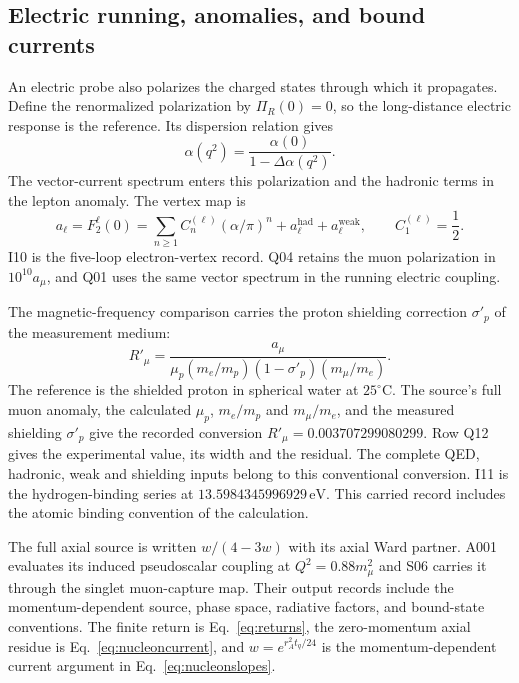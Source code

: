 \documentclass[aps,prx,onecolumn,10pt,notitlepage,nofootinbib,longbibliography]{revtex4-2}
\numberwithin{equation}{section}
\numberwithin{table}{section}
\newcommand{\eV}{\,\mathrm{eV}}
\begin{document}
\subsection{Electric running, anomalies, and bound currents}
An electric probe also polarizes the charged states through which it propagates. Define the renormalized polarization by $\Pi_R(0)=0$, so the long-distance electric response is the reference. Its dispersion relation gives
\begin{equation}
 \alpha(q^2)=\frac{\alpha(0)}{1-\Delta\alpha(q^2)}.
\end{equation}
The vector-current spectrum enters this polarization and the hadronic terms in the lepton anomaly. The vertex map is
\begin{equation}
 a_\ell=F_2^\ell(0)=\sum_{n\geq1}C_n^{(\ell)}(\alpha/\pi)^n
 +a_\ell^{\mathrm{had}}+a_\ell^{\mathrm{weak}},
 \qquad C_1^{(\ell)}=\frac12.
\end{equation}
I10 is the five-loop electron-vertex record. Q04 retains the muon polarization in $10^{10}a_\mu$, and Q01 uses the same vector spectrum in the running electric coupling.

The magnetic-frequency comparison carries the proton shielding correction $\sigma'_p$ of the measurement medium:
\begin{equation}
 R'_\mu=\frac{a_\mu}
 {\mu_p(m_e/m_p)(1-\sigma'_p)(m_\mu/m_e)}.
\end{equation}
The reference is the shielded proton in spherical water at $25^\circ\mathrm C$.
The source's full muon anomaly, the calculated $\mu_p$, $m_e/m_p$ and $m_\mu/m_e$,
and the measured shielding $\sigma'_p$ give the recorded conversion
$R'_\mu=0.003707299080299$. Row Q12 gives the experimental value,
its width and the residual.
The complete QED, hadronic, weak and shielding inputs belong to this conventional
conversion.\cite{MuonG2Final}
 I11 is the hydrogen-binding series at $13.5984345996929\eV$. This carried record includes the atomic binding convention of the calculation.

The full axial source is written $w/(4-3w)$ with its axial Ward partner. A001 evaluates its induced pseudoscalar coupling at $Q^2=0.88m_\mu^2$ and S06 carries it through the singlet muon-capture map. Their output records include the momentum-dependent source, phase space, radiative factors, and bound-state conventions. The finite return is Eq.~\eqref{eq:returns}, the zero-momentum axial residue is Eq.~\eqref{eq:nucleoncurrent}, and $w=e^{r_A^2t_q/24}$ is the momentum-dependent current argument in Eq.~\eqref{eq:nucleonslopes}.
\end{document}
